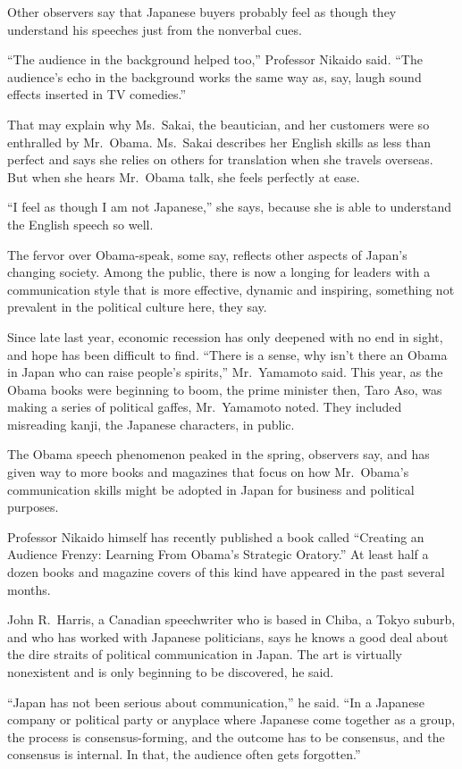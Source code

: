 ﻿\documentclass[12pt]{article}
\begin{document}
Other observers say that Japanese buyers probably feel as though they understand his speeches just
from the nonverbal cues.

``The audience in the background helped too,'' Professor Nikaido said. ``The audience's echo in the
background works the same way as, say, laugh sound effects inserted in TV comedies.''

That may explain why Ms.~Sakai, the beautician, and her customers were so enthralled by Mr.~Obama.
Ms.~Sakai describes her English skills as less than perfect and says she relies on others for
translation when she travels overseas. But when she hears Mr.~Obama talk, she feels perfectly at
ease.

``I feel as though I am not Japanese,'' she says, because she is able to understand the English
speech so well.

The fervor over Obama-speak, some say, reflects other aspects of Japan's changing society. Among the
public, there is now a longing for leaders with a communication style that is more effective,
dynamic and inspiring, something not prevalent in the political culture here, they say.

Since late last year, economic recession has only deepened with no end in sight, and hope has been
difficult to find. ``There is a sense, why isn't there an Obama in Japan who can raise people's
spirits,'' Mr.~Yamamoto said. This year, as the Obama books were beginning to boom, the prime
minister then, Taro Aso, was making a series of political gaffes, Mr.~Yamamoto noted. They included
misreading kanji, the Japanese characters, in public.

The Obama speech phenomenon peaked in the spring, observers say, and has given way to more books and
magazines that focus on how Mr.~Obama's communication skills might be adopted in Japan for business
and political purposes.

Professor Nikaido himself has recently published a book called ``Creating an Audience Frenzy:
Learning From Obama's Strategic Oratory.'' At least half a dozen books and magazine covers of this
kind have appeared in the past several months.

John R.~Harris, a Canadian speechwriter who is based in Chiba, a Tokyo suburb, and who has worked
with Japanese politicians, says he knows a good deal about the dire straits of political
communication in Japan. The art is virtually nonexistent and is only beginning to be discovered, he
said.

``Japan has not been serious about communication,'' he said. ``In a Japanese company or political
party or anyplace where Japanese come together as a group, the process is consensus-forming, and the
outcome has to be consensus, and the consensus is internal. In that, the audience often gets
forgotten.''
\end{document}
